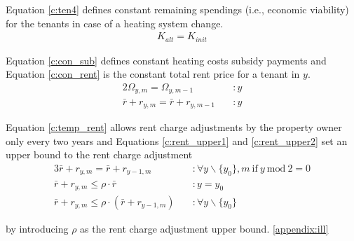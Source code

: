  Equation \ref{c:ten4} defines constant remaining spendings (i.e., economic viability) for the tenants in case of a heating system change. 
\begin{align}\label{c:ten4}
K_{alt} = K_{init}
\end{align}

Equation \ref{c:con_sub} defines constant heating costs subsidy payments and Equation \ref{c:con_rent} is the constant total rent price for a tenant in $y$.
\begin{alignat}{2}
\Omega_{y,m} = \Omega_{y,m-1} \quad &:y\label{c:con_sub}\\
\bar{r} + r_{y,m} = \bar{r} + r_{y,m-1} \quad &:y\label{c:con_rent}
\end{alignat}

Equation \ref{c:temp_rent} allows rent charge adjustments by the property owner only every two years and Equations \ref{c:rent_upper1} and \ref{c:rent_upper2} set an upper bound to the rent charge adjustment
\begin{alignat}{3}
\bar{r} + r_{y,m} = \bar{r} + r_{y-1,m} \quad &:\forall y\backslash \{y_0\},m~\text{if}~y~\text{mod}~2=0\label{c:temp_rent}\\
\bar{r}+r_{y,m} \leq \rho \cdot \bar{r} \quad &:y=y_0\label{c:rent_upper1}\\
\bar{r}+r_{y,m} \leq \rho \cdot \left(\bar{r}+r_{y-1,m}\right) \quad &:\forall y\backslash \{y_0\}\label{c:rent_upper2}
\end{alignat}

by introducing $\rho$ as the rent charge adjustment upper bound.  \ref{appendix:ill} 

